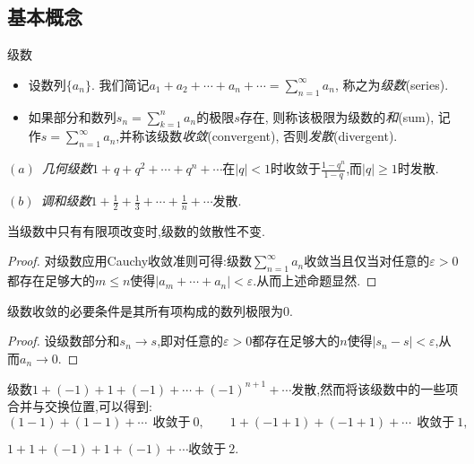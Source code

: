 \subsection{基本概念}

\begin{definition}{级数}
	\vspace{-2em}
	\begin{itemize}
		\item 设数列$\{ a_n \}$. 我们简记$a_1+a_2+\cdots +a_n + \cdots = \sum_{n=1}^{\infty} a_n$, 称之为\textit{级数}(series).
		\item 如果部分和数列$s_n=\sum_{k=1}^n a_n$的极限$s$存在, 则称该极限为级数的\textit{和}(sum), 记作$s=\sum_{n=1}^{\infty} a_n$,并称该级数\textit{收敛}(convergent), 否则\textit{发散}(divergent).
	\end{itemize}
\end{definition}

\begin{example}
	$(a)$~\textit{几何级数}$1+q+q^2+\cdots +q^n+\cdots$在$|q|<1$时收敛于$\frac{1-q^n}{1-q}$,而$|q|\geq 1$时发散.
	
	$(b)$~\textit{调和级数}$1+\frac{1}{2}+\frac{1}{3}+\cdots + \frac{1}{n} + \cdots$发散.
\end{example}

\begin{proposition}{}
	当级数中只有有限项改变时,级数的敛散性不变.
\end{proposition}
\begin{proof}
	对级数应用Cauchy收敛准则可得:级数$\sum_{n=1}^{\infty} a_n$收敛当且仅当对任意的$\varepsilon >0$都存在足够大的$m \leq n$使得$|a_m + \cdots + a_n|<\varepsilon$.从而上述命题显然.
\end{proof}

\begin{proposition}{}
	级数收敛的必要条件是其所有项构成的数列极限为$0$.
\end{proposition}
\begin{proof}
	设级数部分和$s_n \to s$,即对任意的$\varepsilon >0$都存在足够大的$n$使得$|s_n-s|<\varepsilon$,从而$a_n \to 0$.
\end{proof}

\begin{example}
	级数$1+(-1)+1+(-1)+\cdots +(-1)^{n+1}+\cdots$发散,然而将该级数中的一些项合并与交换位置,可以得到:
	$$(1-1)+(1-1)+\cdots ~~\textit{收敛于}~0, \qquad 1+(-1+1)+(-1+1)+\cdots ~~\textit{收敛于}~1,$$
	\begin{center}
		$1+1+(-1)+1+(-1)+\cdots \textit{收敛于}~2.$
	\end{center}
\end{example}

